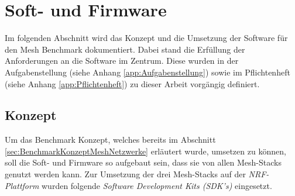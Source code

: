 \clearpage
\section{Soft- und Firmware}\label{sec:Soft-undFirmware}

Im folgenden Abschnitt wird das Konzept und die Umsetzung der Software für den Mesh Benchmark dokumentiert.
Dabei stand die Erfüllung der Anforderungen an die Software im Zentrum. Diese wurden in der Aufgabenstellung (siehe Anhang \ref{app:Aufgabenstellung}) sowie im Pflichtenheft (siehe Anhang \ref{app:Pflichtenheft}) zu dieser Arbeit vorgängig definiert. 


\subsection{Konzept}\label{subsec:Software_Konzept}
Um das Benchmark Konzept, welches bereits im Abschnitt \ref{sec:BenchmarkKonzeptMeshNetzwerke} erläutert wurde, umsetzen zu können, soll die Soft- und Firmware so aufgebaut sein, dass sie von allen Mesh-Stacks genutzt werden kann.
Zur Umsetzung der drei Mesh-Stacks auf der \textit{NRF-Plattform} wurden folgende \textit{Software Development Kits (SDK's)} eingesetzt. 

\begin{table}[h]
\centering
{}
\caption{Eingesetzte SDK's für die Umsetzung der Benchmark Firmware}
\label{tab:Eingesetzte SDKs}
\end{table}

